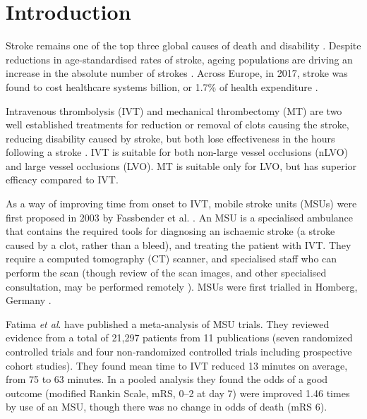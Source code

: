 \section{Introduction}


Stroke remains one of the top three global causes of death and disability \cite{feigin_global_2021}. Despite reductions in age-standardised rates of stroke, ageing populations are driving an increase in the absolute number of strokes \cite{feigin_global_2021}. Across Europe, in 2017, stroke was found to cost healthcare systems  billion, or 1.7\% of health expenditure \cite{luengo-fernandez_economic_2020}.

Intravenous thrombolysis (IVT) and mechanical thrombectomy (MT) are two well established treatments for reduction or removal of clots causing the stroke, reducing disability caused by stroke, but both lose effectiveness in the hours following a stroke \cite{emberson_effect_2014, fransen_time_2016}. IVT is suitable for both non-large vessel occlusions (nLVO) and large vessel occlusions (LVO). MT is suitable only for LVO, but has superior efficacy compared to IVT.


As a way of improving time from onset to IVT, mobile stroke units (MSUs) were first proposed in 2003 by Fassbender et al. \cite{fassbender_mobile_2003}. An MSU is a specialised ambulance that contains the required tools for diagnosing an ischaemic stroke (a stroke caused by a clot, rather than a bleed), and treating the patient with IVT. They require a computed tomography (CT) scanner, and specialised staff who can perform the scan (though review of the scan images, and other specialised consultation, may be performed remotely \cite{taqui_reduction_2017}). MSUs were first trialled in Homberg, Germany \cite{walter_diagnosis_2012}.

Fatima \textit{et al}. \cite{fatima_mobile_2020} have published a meta-analysis of MSU trials. They reviewed evidence from a total of 21,297 patients from 11 publications (seven randomized controlled trials and four non-randomized controlled trials including prospective cohort studies). They found mean time to IVT reduced 13 minutes on average, from 75 to 63 minutes. In a pooled analysis they found the odds of a good outcome (modified Rankin Scale, mRS, 0–2 at day 7) were improved 1.46 times by use of an MSU, though there was no change in odds of death (mRS 6).

